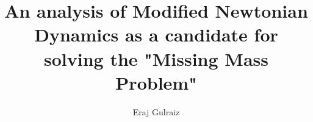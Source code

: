 \documentclass[12pt]{book}
\title{An analysis of Modified Newtonian Dynamics as a candidate for solving the "Missing Mass Problem"}
\author{Eraj Gulraiz}
\begin{document}
    \makefrontmatter        %

    
    

    \makereferences         %
\end{document}

